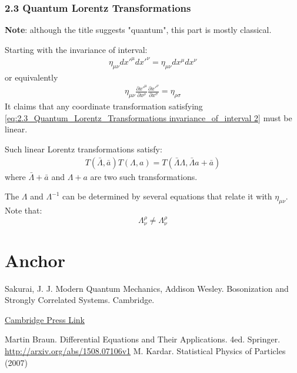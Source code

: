 \documentclass{article}
\numberwithin{equation}{subsection} %
\theoremstyle{definition}
\begin{document}
    \subsubsection{2.3 Quantum Lorentz Transformations}
    \label{sec:2.3_Quantum_Lorentz_Transformations}
    \textbf{Note}: although the title suggests "quantum", this part is
    mostly classical.

    Starting with the invariance of interval:
    \begin{align}
        \label{eq:2.3_Quantum_Lorentz_Transformations invariance_of_interval}
        \eta_{\mu\nu}dx'^\mu dx'^\nu = \eta_{\mu\nu}dx^\mu dx^\nu
    \end{align}
    or equivalently %
    \begin{align}
        \label{eq:2.3_Quantum_Lorentz_Transformations invariance_of_interval 2}
        \eta_{\mu\nu} \frac{\partial x'^\mu}{\partial x^\rho}
            \frac{\partial x'^\nu}{\partial x^\sigma}
            =
        \eta_{\rho\sigma}
    \end{align}
    It claims that any coordinate transformation satisfying 
    \ref{eq:2.3_Quantum_Lorentz_Transformations invariance_of_interval 2}
    must be linear.

    Such linear Lorentz transformations satisfy:
    \begin{align}
        T(\bar{\Lambda},\bar{a})T(\Lambda,a) = 
            T(\bar{\Lambda}\Lambda, \bar{\Lambda}a+\bar{a})
    \end{align}
    where $\bar{\Lambda}+\bar{a}$ and $\Lambda+a$ are two such 
    transformations.

    The $\Lambda$ and $\Lambda^{-1}$ can be determined by several 
    equations that relate it with $\eta_{\mu\nu}$. Note that:
    $$ \Lambda^{\rho}_{ \nu} \neq \Lambda^{ \rho}_\nu$$
\section{Anchor}
\begin{thebibliography}{1}
	 Sakurai, J. J. Modern Quantum Mechanics, Addison Wesley.
	 Bosonization and Strongly Correlated Systems. Cambridge.

        \href{http://www.cambridge.org/us/academic/subjects/physics/condensed-matter-physics-nanoscience-and-mesoscopic-physics/bosonization-and-strongly-correlated-systems}{Cambridge Press Link}

     Martin Braun. Differential Equations and Their
    Applications. 4ed. Springer.
     \url{http://arxiv.org/abs/1508.07106v1}
     M. Kardar. Statistical Physics of Particles (2007)
\end{thebibliography}
\end{document}
